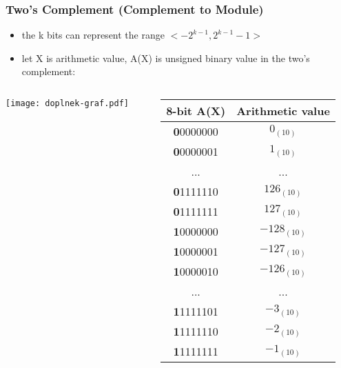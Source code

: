 \documentclass{beamer}
\begin{document}
\begin{frame}
\frametitle{Two's Complement (Complement to Module)}
\begin{itemize}
\item the k bits can represent the range $<-2^{k-1}, 2^{k-1}-1>$
\item let X is arithmetic value, A(X) is unsigned binary value in the two's complement:
\end{itemize}
\vspace{-0.3cm}
\begin{columns}
\begin{column}{0.5\textwidth}
\texttt{[image: doplnek-graf.pdf]}
\end{column}
\hfill
\begin{column}{0.5\textwidth}
\begin{tabular}{|c|c|}\hline
{\small 8-bit A(X)}  & {\small Arithmetic value} \\\hline
\textbf{0}0000000 & $0_{(10)}$ \\ \hline
\textbf{0}0000001 & $1_{(10)}$ \\ \hline
... & ... \\\hline
\textbf{0}1111110 & $126_{(10)}$ \\ \hline
\textbf{0}1111111 & $127_{(10)}$ \\ \hline
\textbf{1}0000000 & $-128_{(10)}$ \\ \hline
\textbf{1}0000001 & $-127_{(10)}$ \\ \hline
\textbf{1}0000010 & $-126_{(10)}$ \\ \hline
... & ... \\\hline
\textbf{1}1111101 & $-3_{(10)}$ \\ \hline
\textbf{1}1111110 & $-2_{(10)}$ \\ \hline
\textbf{1}1111111 & $-1_{(10)}$ \\ \hline
\end{tabular}
\end{column}
\end{columns}
\end{frame}
\end{document}
